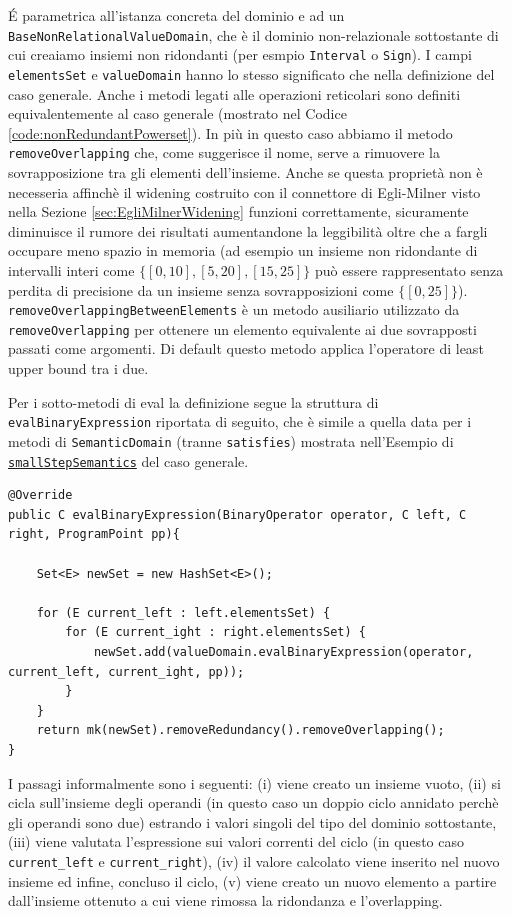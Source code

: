 \'E parametrica all'istanza concreta del dominio e ad un \texttt{BaseNonRelationalValueDomain}, che è il dominio non-relazionale sottostante di cui creaiamo insiemi non ridondanti (per esmpio \texttt{Interval} o \texttt{Sign}). I campi \texttt{elementsSet} e \texttt{valueDomain} hanno lo stesso significato che nella definizione del caso generale. Anche i metodi legati alle operazioni reticolari sono definiti equivalentemente al caso generale (mostrato nel Codice \ref{code:nonRedundantPowerset}). In più in questo caso abbiamo il metodo \texttt{removeOverlapping} che, come suggerisce il nome, serve a rimuovere la sovrapposizione tra gli elementi dell'insieme. Anche se questa proprietà non è necesseria affinchè il widening costruito con il connettore di Egli-Milner visto nella Sezione \ref{sec:EgliMilnerWidening} funzioni correttamente, sicuramente diminuisce il rumore dei risultati aumentandone la leggibilità oltre che a fargli occupare meno spazio in memoria (ad esempio un insieme non ridondante di intervalli interi come \(\{[0, 10], [5, 20], [15, 25]\}\) può essere rappresentato senza perdita di precisione da un insieme senza sovrapposizioni come \(\{[0, 25]\}\)). \texttt{removeOverlappingBetweenElements} è un metodo ausiliario utilizzato da \texttt{removeOverlapping} per ottenere un elemento equivalente ai due sovrapposti passati come argomenti. Di default questo metodo applica l'operatore di least upper bound tra i due.

Per i sotto-metodi di eval la definizione segue la struttura di \texttt{evalBinaryExpression} riportata di seguito, che è simile a quella data per i metodi di \texttt{SemanticDomain} (tranne \texttt{satisfies}) mostrata nell'Esempio di \hyperref[code:smallStepSemanticsPowersetGeneral]{\texttt{smallStepSemantics}} del caso generale.
\begin{lstlisting}[belowskip=-1.1 \baselineskip]
@Override
public C evalBinaryExpression(BinaryOperator operator, C left, C right, ProgramPoint pp){

    Set<E> newSet = new HashSet<E>();
    
    for (E current_left : left.elementsSet) {
        for (E current_ight : right.elementsSet) {
            newSet.add(valueDomain.evalBinaryExpression(operator, current_left, current_ight, pp));
        }
    }
    return mk(newSet).removeRedundancy().removeOverlapping();
}
\end{lstlisting}
I passagi informalmente sono i seguenti: (i) viene creato un insieme vuoto, (ii) si cicla sull'insieme degli operandi (in questo caso un doppio ciclo annidato perchè gli operandi sono due) estrando i valori singoli del tipo del dominio sottostante, (iii) viene valutata l'espressione sui valori correnti del ciclo (in questo caso \texttt{current\_left} e \texttt{current\_right}), (iv) il valore calcolato viene inserito nel nuovo insieme ed infine, concluso il ciclo, (v) viene creato un nuovo elemento a partire dall'insieme ottenuto a cui viene rimossa la ridondanza e l'overlapping.

